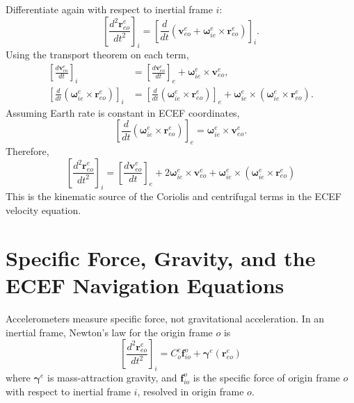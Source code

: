 \documentclass[11pt,oneside]{book}
\begin{document}
Differentiate again with respect to inertial frame $i$:
\begin{equation}
\left[
\frac{d^2\mathbf{r}_{eo}^{e}}{dt^2}
\right]_i
=
\left[
\frac{d}{dt}
\left(
\mathbf{v}_{eo}^{e}
+
\boldsymbol{\omega}_{ie}^{e}
\times
\mathbf{r}_{eo}^{e}
\right)
\right]_i.
\end{equation}
Using the transport theorem on each term,
\begin{align}
\left[
\frac{d\mathbf{v}_{eo}^{e}}{dt}
\right]_i
&=
\left[
\frac{d\mathbf{v}_{eo}^{e}}{dt}
\right]_e
+
\boldsymbol{\omega}_{ie}^{e}
\times
\mathbf{v}_{eo}^{e},\\
\left[
\frac{d}{dt}
\left(
\boldsymbol{\omega}_{ie}^{e}
\times
\mathbf{r}_{eo}^{e}
\right)
\right]_i
&=
\left[
\frac{d}{dt}
\left(
\boldsymbol{\omega}_{ie}^{e}
\times
\mathbf{r}_{eo}^{e}
\right)
\right]_e
+
\boldsymbol{\omega}_{ie}^{e}
\times
\left(
\boldsymbol{\omega}_{ie}^{e}
\times
\mathbf{r}_{eo}^{e}
\right).
\end{align}
Assuming Earth rate is constant in ECEF coordinates,
\begin{equation}
\left[
\frac{d}{dt}
\left(
\boldsymbol{\omega}_{ie}^{e}
\times
\mathbf{r}_{eo}^{e}
\right)
\right]_e
=
\boldsymbol{\omega}_{ie}^{e}
\times
\mathbf{v}_{eo}^{e}.
\end{equation}
Therefore,
\begin{equation}
\boxed{
\left[
\frac{d^2\mathbf{r}_{eo}^{e}}{dt^2}
\right]_i
=
\left[
\frac{d\mathbf{v}_{eo}^{e}}{dt}
\right]_e
+
2\boldsymbol{\omega}_{ie}^{e}
\times
\mathbf{v}_{eo}^{e}
+
\boldsymbol{\omega}_{ie}^{e}
\times
\left(
\boldsymbol{\omega}_{ie}^{e}
\times
\mathbf{r}_{eo}^{e}
\right)
}
\label{eq:ecef_acceleration_transport_full}
\end{equation}
This is the kinematic source of the Coriolis and centrifugal terms in the ECEF velocity equation.

\section{Specific Force, Gravity, and the ECEF Navigation Equations}

Accelerometers measure specific force, not gravitational acceleration. In an inertial frame, Newton's law for the origin frame $o$ is
\begin{equation}
\boxed{
\left[
\frac{d^2\mathbf{r}_{eo}^{e}}{dt^2}
\right]_i
=
C_o^e\mathbf{f}_{io}^{o}
+
\boldsymbol{\gamma}^{e}\left(\mathbf{r}_{eo}^{e}\right)
}
\label{eq:newton_specific_force_origin}
\end{equation}
where $\boldsymbol{\gamma}^{e}$ is mass-attraction gravity, and $\mathbf{f}_{io}^{o}$ is the specific force of origin frame $o$ with respect to inertial frame $i$, resolved in origin frame $o$.
\end{document}
